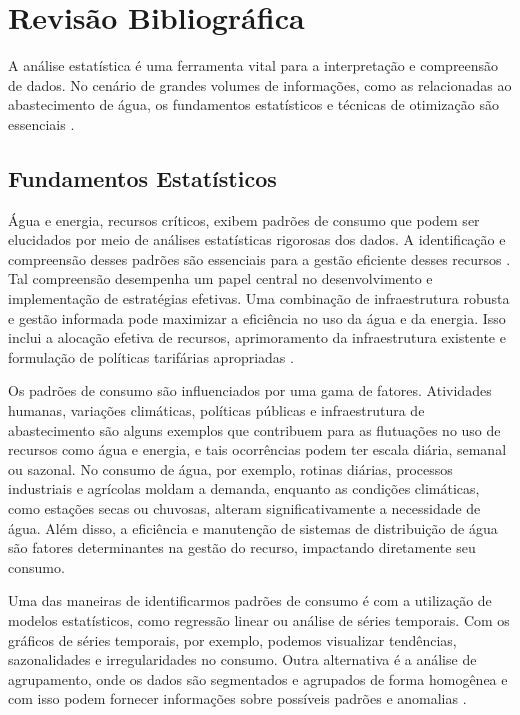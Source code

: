 \chapter{Revisão Bibliográfica}
\label{cap:revisao-bibliografica}

A análise estatística é uma ferramenta vital para a interpretação e compreensão de dados. No cenário de grandes volumes de informações, como as relacionadas ao abastecimento de água, os fundamentos estatísticos e técnicas de otimização são essenciais \cite{Bulmer}.

\section{Fundamentos Estatísticos}
Água e energia, recursos críticos, exibem padrões de consumo que podem ser elucidados por meio de análises estatísticas rigorosas dos dados. A identificação e compreensão desses padrões são essenciais para a gestão eficiente desses recursos \cite{reiter14EnergyConsumption}. Tal compreensão desempenha um papel central no desenvolvimento e implementação de estratégias efetivas. Uma combinação de infraestrutura robusta e gestão informada pode maximizar a eficiência no uso da água e da energia. Isso inclui a alocação efetiva de recursos, aprimoramento da infraestrutura existente e formulação de políticas tarifárias apropriadas \cite{sancho19WaterConsumption}.

Os padrões de consumo são influenciados por uma gama de fatores. Atividades humanas, variações climáticas, políticas públicas e infraestrutura de abastecimento são alguns exemplos que contribuem para as flutuações no uso de recursos como água e energia, e tais ocorrências podem ter escala diária, semanal ou sazonal. No consumo de água, por exemplo, rotinas diárias, processos industriais e agrícolas moldam a demanda, enquanto as condições climáticas, como estações secas ou chuvosas, alteram significativamente a necessidade de água. Além disso, a eficiência e manutenção de sistemas de distribuição de água são fatores determinantes na gestão do recurso, impactando diretamente seu consumo.

Uma das maneiras de identificarmos padrões de consumo é com a utilização de modelos estatísticos, como regressão linear ou análise de séries temporais. Com os gráficos de séries temporais, por exemplo, podemos visualizar tendências, sazonalidades e irregularidades no consumo. Outra alternativa é a análise de agrupamento, onde os dados são segmentados e agrupados de forma homogênea e com isso podem fornecer informações sobre possíveis padrões e anomalias \cite{bishop2006pattern}.


